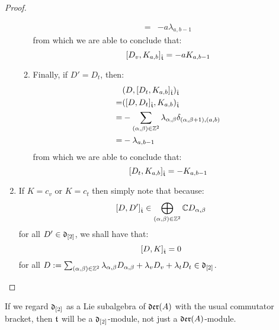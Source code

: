 \begin{proof}
\begin{enumerate}
\begin{enumerate}
$$\begin{aligned}
                                    = & -a \lambda_{a, b - 1}
                                \end{aligned}
                            $$
                        from which we are able to conclude that:
                            $$[D_v, K_{a, b}]_{\hat{\mathfrak{t}}} = -aK_{a, b - 1}$$   
                        \item Finally, if $D' = D_t$, then:
                            $$
                                \begin{aligned}
                                    & ( D, [D_t, K_{a, b}]_{\hat{\mathfrak{t}}} )_{\hat{\mathfrak{t}}}
                                    \\
                                    = & ( [D, D_t]_{\hat{\mathfrak{t}}}, K_{a, b} )_{\hat{\mathfrak{t}}}
                                    \\
                                    = & -\sum_{(\alpha, \beta) \in \mathbb{Z}^2} \lambda_{\alpha, \beta} \delta_{(\alpha, \beta + 1), (a, b)} 
                                    \\
                                    = & -\lambda_{a, b - 1}
                                \end{aligned}
                            $$
                        from which we are able to conclude that:
                            $$[D_t, K_{a, b}]_{\hat{\mathfrak{t}}} = -K_{a, b - 1}$$
                    \end{enumerate}
                    \item If $K = c_v$ or $K = c_t$ then simply note that because:
                        $$[D, D']_{\hat{\mathfrak{t}}} \in \bigoplus_{(\alpha, \beta) \in \mathbb{Z}^2} \mathbb{C} D_{\alpha, \beta}$$
                    for all $D' \in \mathfrak{d}_{[2]}$, we shall have that:
                        $$[D, K]_{\hat{\mathfrak{t}}} = 0$$
                    for all $D := \sum_{(\alpha, \beta) \in \mathbb{Z}^2} \lambda_{\alpha, \beta} D_{\alpha, \beta} + \lambda_v D_v + \lambda_t D_t \in \mathfrak{d}_{[2]}$.
                \end{enumerate}
            \end{proof}
        
        \begin{proposition} \label{prop: toroidal_lie_algebras_as_modules_over_div_0_vector_field_lie_algebras}
            If we regard $\mathfrak{d}_{[2]}$ as a Lie subalgebra of $\mathfrak{der}(A)$ with the usual commutator bracket, then $\mathfrak{t}$ will be a $\mathfrak{d}_{[2]}$-module, not just a $\mathfrak{der}(A)$-module.
        \end{proposition}
        
